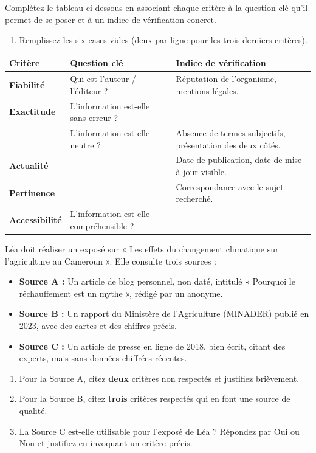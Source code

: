 \documentclass[11pt]{article}
\begin{document}
\begin{exercice}
Complétez le tableau ci-dessous en associant chaque critère à la question clé qu'il permet de se poser et à un indice de vérification concret.
\begin{enumerate}
    \item Remplissez les six cases vides (deux par ligne pour les trois derniers critères).
\end{enumerate}
\medskip
\begin{tabularx}{\linewidth}{|>{\bfseries}l|X|X|}
\hline
\textbf{Critère} & \textbf{Question clé} & \textbf{Indice de vérification} \\
\hline
Fiabilité & Qui est l'auteur / l'éditeur ? & Réputation de l'organisme, mentions légales. \\
\hline
Exactitude & L'information est-elle sans erreur ? & \dotfill \\
\hline
\dotfill & L'information est-elle neutre ? & Absence de termes subjectifs, présentation des deux côtés. \\
\hline
Actualité & \dotfill & Date de publication, date de mise à jour visible. \\
\hline
Pertinence & \dotfill & Correspondance avec le sujet recherché. \\
\hline
Accessibilité & L'information est-elle compréhensible ? & \dotfill \\
\hline
\end{tabularx}
\end{exercice}

\begin{exercice}
Léa doit réaliser un exposé sur « Les effets du changement climatique sur l'agriculture au Cameroun ». Elle consulte trois sources :
\begin{itemize}
    \item \textbf{Source A :} Un article de blog personnel, non daté, intitulé « Pourquoi le réchauffement est un mythe », rédigé par un anonyme.
    \item \textbf{Source B :} Un rapport du Ministère de l'Agriculture (MINADER) publié en 2023, avec des cartes et des chiffres précis.
    \item \textbf{Source C :} Un article de presse en ligne de 2018, bien écrit, citant des experts, mais sans données chiffrées récentes.
\end{itemize}
\begin{enumerate}
    \item Pour la Source A, citez \textbf{deux} critères non respectés et justifiez brièvement.
    \item Pour la Source B, citez \textbf{trois} critères respectés qui en font une source de qualité.
    \item La Source C est-elle utilisable pour l'exposé de Léa ? Répondez par Oui ou Non et justifiez en invoquant un critère précis.
\end{enumerate}
\end{exercice}
\end{document}
